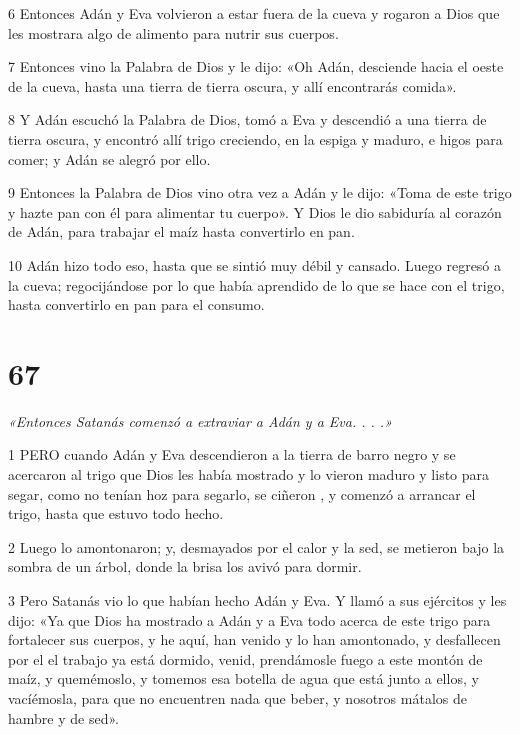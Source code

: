\par 6 Entonces Adán y Eva volvieron a estar fuera de la cueva y rogaron a Dios que les mostrara algo de alimento para nutrir sus cuerpos.

\par 7 Entonces vino la Palabra de Dios y le dijo: «Oh Adán, desciende hacia el oeste de la cueva, hasta una tierra de tierra oscura, y allí encontrarás comida».

\par 8 Y Adán escuchó la Palabra de Dios, tomó a Eva y descendió a una tierra de tierra oscura, y encontró allí trigo creciendo, en la espiga y maduro, e higos para comer; y Adán se alegró por ello.

\par 9 Entonces la Palabra de Dios vino otra vez a Adán y le dijo: «Toma de este trigo y hazte pan con él para alimentar tu cuerpo». Y Dios le dio sabiduría al corazón de Adán, para trabajar el maíz hasta convertirlo en pan.

\par 10 Adán hizo todo eso, hasta que se sintió muy débil y cansado. Luego regresó a la cueva; regocijándose por lo que había aprendido de lo que se hace con el trigo, hasta convertirlo en pan para el consumo.

\chapter{67}

\par \textit{«Entonces Satanás comenzó a extraviar a Adán y a Eva. . . .»}

\par 1 PERO cuando Adán y Eva descendieron a la tierra de barro negro y se acercaron al trigo que Dios les había mostrado y lo vieron maduro y listo para segar, como no tenían hoz para segarlo, se ciñeron , y comenzó a arrancar el trigo, hasta que estuvo todo hecho.

\par 2 Luego lo amontonaron; y, desmayados por el calor y la sed, se metieron bajo la sombra de un árbol, donde la brisa los avivó para dormir.

\par 3 Pero Satanás vio lo que habían hecho Adán y Eva. Y llamó a sus ejércitos y les dijo: «Ya que Dios ha mostrado a Adán y a Eva todo acerca de este trigo para fortalecer sus cuerpos, y he aquí, han venido y lo han amontonado, y desfallecen por el el trabajo ya está dormido, venid, prendámosle fuego a este montón de maíz, y quemémoslo, y tomemos esa botella de agua que está junto a ellos, y vacíémosla, para que no encuentren nada que beber, y nosotros mátalos de hambre y de sed».

